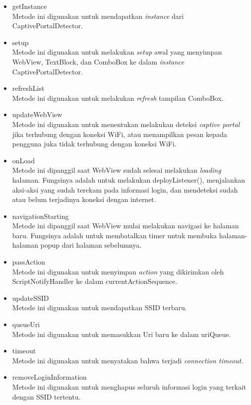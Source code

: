 {\begin{itemize}
        \item{getInstance\\Metode ini digunakan untuk mendapatkan \textit{instance} dari CaptivePortalDetector.}
        \item{setup\\Metode ini digunakan untuk melakukan \textit{setup} awal yang menyimpan WebView, TextBlock, dan ComboBox ke dalam \textit{instance} CaptivePortalDetector.}
        \item{refreshList\\Metode ini digunakan untuk melakukan \textit{refresh} tampilan ComboBox.}
        \item{updateWebView\\Metode ini digunakan untuk menentukan melakukan deteksi \textit{captive portal} jika terhubung dengan koneksi WiFi, atau menampilkan pesan kepada pengguna juka tidak terhubung dengan koneksi WiFi.}
        \item{onLoad\\Metode ini dipanggil saat WebView sudah selesai melakukan \textit{loading} halaman. Fungsinya adalah untuk melakukan deployListener(), menjalankan aksi-aksi yang sudah terekam pada informasi login, dan mendeteksi sudah atau belum terjadinya koneksi dengan internet.}
        \item{navigationStarting\\Metode ini dipanggil saat WebView mulai melakukan navigasi ke halaman baru. Fungsinya adalah untuk membatalkan timer untuk membuka halaman-halaman popup dari halaman sebelumnya.}
        \item{passAction\\Metode ini digunakan untuk menyimpan \textit{action} yang dikirimkan oleh ScriptNotifyHandler ke dalam currentActionSequence.}
        \item{updateSSID\\Metode ini digunakan untuk mendapatkan SSID terbaru.}
        \item{queueUri\\Metode ini digunakan untuk memasukkan Uri baru ke dalam uriQueue.}
        \item{timeout\\Metode ini digunakan untuk menyatakan bahwa terjadi \textit{connection timeout}.}
        \item{removeLoginInformation\\Metode ini digunakan untuk menghapus seluruh informasi login yang terkait dengan SSID tertentu.}
    \end{itemize}
}

